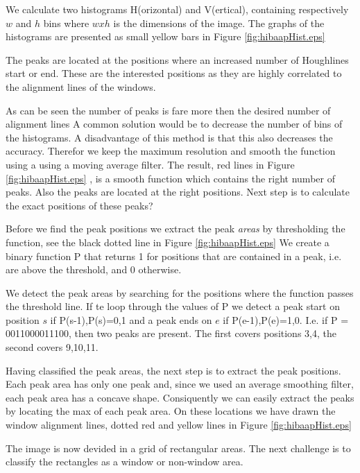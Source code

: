 We calculate two histograms H(orizontal) and V(ertical), containing respectively
$w$ and $h$ bins where $w x h$ is the dimensions of the image.  The graphs of
the histograms are presented as small yellow bars in Figure
\ref{fig:hibaapHist.eps}

The peaks are located at the positions where an increased number of Houghlines
start or end.  These are the interested positions as they are highly correlated
to the alignment lines of the windows. 

As can be seen the number of peaks is fare more then the desired number of alignment lines 
A common solution would be to decrease the number of bins of the histograms. A
disadvantage of this method is that this also decreases the accuracy. Therefor
we keep the maximum resolution and smooth the function using a using a moving
average filter.
The result, red lines in Figure \ref{fig:hibaapHist.eps}
, is a smooth function which contains the right number of peaks. Also the peaks
are located at the right positions. Next step is to calculate the exact positions of these
peaks?

Before we find the peak positions we extract the peak \emph{areas} by thresholding the
function, see the black dotted line in Figure \ref{fig:hibaapHist.eps}
We create a binary function P that returns 1 for positions that are contained in
a peak, i.e. are above the threshold, and 0 otherwise.

We detect the peak areas by searching for the positions where the function
passes the threshold line. 
If te loop through the values of P we detect a peak start on position $s$ if {P(s-1),P(s)}={0,1}
and a peak ends on $e$ if {P(e-1),P(e)}={1,0}. 
I.e. if P = 0011000011100, then two peaks are present. The first covers positions {3,4}, 
the second covers {9,10,11}. 

Having classified the peak areas, the next step is to extract the peak positions. 
Each peak area has only one peak and, since we used an average smoothing filter, each
peak area has a concave shape. Consiquently we can easily extract the peaks
by locating the max of each peak area. 
On these locations we have drawn the window alignment lines, dotted red and yellow lines
in Figure \ref{fig:hibaapHist.eps}

The image is now devided in a grid of rectangular areas. The next challenge is to 
classify the rectangles as a window or non-window area.


